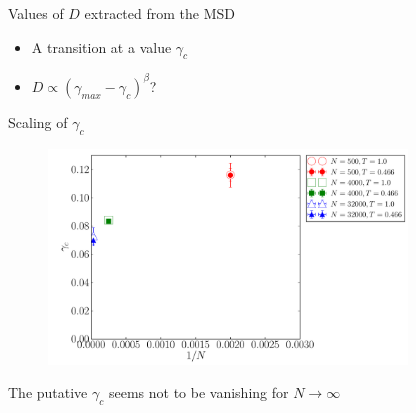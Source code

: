 \documentclass[compress]{beamer}
\begin{document}
	\begin{frame}{Values of $D$ extracted from the MSD}

		\begin{figure}
		\end{figure}
		
		\begin{itemize}
			\item<1-> A transition at a value $\gamma_{c}$
			\item<2-> $D \propto (\gamma_{max} -\gamma_{c})^{\beta}$?
		\end{itemize}
		
	\end{frame}

	\begin{frame}{Scaling of $\gamma_{c}$}

		\begin{figure}
			\includegraphics[width=0.85\textwidth]{Graphics/Graphs/GammacScaling}
		\end{figure}
		
		The putative $\gamma_{c}$ seems not to be vanishing for $N \to \infty$
		
	\end{frame}

	
\end{document}
